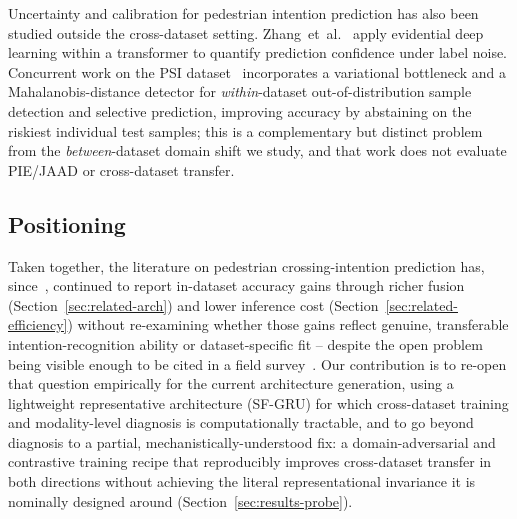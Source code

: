 Uncertainty and calibration for pedestrian intention prediction has also
been studied outside the cross-dataset setting.
Zhang~et~al.~\cite{zhang2023trep} apply evidential deep learning within
a transformer to quantify prediction confidence under label noise.
Concurrent work on the PSI dataset~\cite{ashayer2026psi} incorporates a
variational bottleneck and a Mahalanobis-distance detector for
\emph{within}-dataset out-of-distribution sample detection and selective
prediction, improving accuracy by abstaining on the riskiest individual
test samples; this is a complementary but distinct problem from the
\emph{between}-dataset domain shift we study, and that work does not
evaluate PIE/JAAD or cross-dataset transfer.

\subsection{Positioning}
\label{sec:related-positioning}

Taken together, the literature on pedestrian crossing-intention
prediction has, since~\cite{gesnouin2022}, continued to report
in-dataset accuracy gains through richer fusion
(Section~\ref{sec:related-arch}) and lower inference cost
(Section~\ref{sec:related-efficiency}) without re-examining whether
those gains reflect genuine, transferable intention-recognition ability
or dataset-specific fit -- despite the open problem being visible enough
to be cited in a field survey~\cite{fang2022survey}. Our contribution is
to re-open that question empirically for the current architecture
generation, using a lightweight representative architecture (SF-GRU) for
which cross-dataset training and modality-level diagnosis is
computationally tractable, and to go beyond diagnosis to a partial,
mechanistically-understood fix: a domain-adversarial and contrastive
training recipe that reproducibly improves cross-dataset transfer in
both directions without achieving the literal representational
invariance it is nominally designed around
(Section~\ref{sec:results-probe}).
